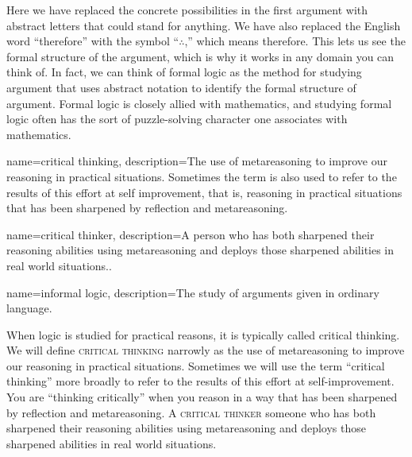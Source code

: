 Here we have replaced the concrete possibilities in the first argument with abstract letters that could stand for anything. We have also replaced the English word ``therefore'' with the symbol ``$\therefore$,'' which means therefore. This lets us see the formal structure of the argument, which is why it works in any domain you can think of. In fact, we can think of formal logic as the method for studying argument that uses abstract notation to identify the formal structure of argument.  Formal logic is closely allied with mathematics, and studying formal logic often has the sort of puzzle-solving character one associates with mathematics. 
	{
	{
{}	
	{}	}}
 
{
name=critical thinking,
description={The use of metareasoning to improve our reasoning in practical situations. Sometimes the term is also used to refer to the results of this effort at self improvement, that is, reasoning in practical situations that has been sharpened by reflection and metareasoning.}
}

{
name=critical thinker,
description={A person who has both sharpened their reasoning abilities using metareasoning and deploys those sharpened abilities in real world situations..}
}

{
name=informal logic,
description={The study of arguments given in ordinary language.}
}


When logic is studied for practical reasons, it is typically called critical thinking. We will define \textsc{\gls{critical thinking}}\label{def:Critical_Thinking}  narrowly as the use of metareasoning to improve our reasoning in practical situations.  Sometimes we will use the term ``critical thinking'' more broadly to refer to the results of this effort at self-improvement.  You are ``thinking critically'' when you reason in a way that has been sharpened by reflection and metareasoning. A \textsc{\gls{critical thinker}}\label{def:critical_thinker} someone who has both sharpened their reasoning abilities using metareasoning and deploys those sharpened abilities in real world situations.

